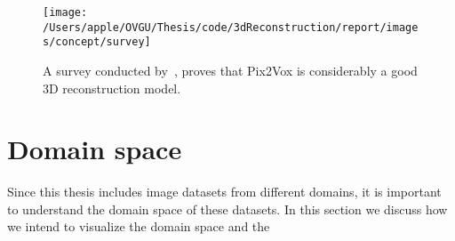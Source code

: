 \begin{figure}
    \centering
    \texttt{[image: /Users/apple/OVGU/Thesis/code/3dReconstruction/report/images/concept/survey]}
    \caption{A survey conducted by~\cite{Han2021ImageBased3O}, proves that Pix2Vox is considerably a good 3D reconstruction model.
    }
    \label{fig:survey on 3d reconstruction}
\end{figure}


\section{Domain space}\label{sec:domain-space}

Since this thesis includes image datasets from different domains, it is important to understand the domain space of these datasets.
In this section we discuss how we intend to visualize the domain space and the
